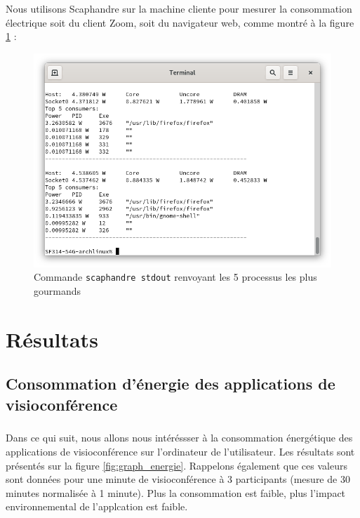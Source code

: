 \documentclass[11pt,a4paper]{report}
\begin{document}
Nous utilisons Scaphandre sur la machine cliente pour mesurer la consommation électrique soit du client Zoom, soit du navigateur web, comme montré à la figure \ref{fig:scaph} :
\begin{figure}[!h]
    \centering
    \includegraphics[scale=0.5]{capture_scaphandre.png}
    \caption{Commande \texttt{scaphandre stdout} renvoyant les 5 processus les plus gourmands}
    \label{fig:scaph}
\end{figure}



\chapter{Résultats}

\section{Consommation d’énergie des applications de visioconférence}

\paragraph{}
Dans ce qui suit, nous allons nous intéréssser à la consommation énergétique des applications de visioconférence sur l'ordinateur de l'utilisateur. Les résultats sont présentés sur la figure \ref{fig:graph_energie}. Rappelons également que ces valeurs sont données pour une minute de visioconférence à 3 participants (mesure de 30 minutes normalisée à 1 minute). Plus la consommation est faible, plus l'impact environnemental de l'applcation est faible.
\end{document}
